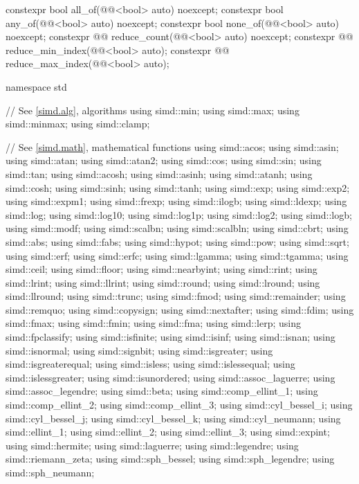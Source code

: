 \begin{codeblock}
{  constexpr bool all_of(@@<bool> auto) noexcept;
  constexpr bool any_of(@@<bool> auto) noexcept;
  constexpr bool none_of(@@<bool> auto) noexcept;
  constexpr @@ reduce_count(@@<bool> auto) noexcept;
  constexpr @@ reduce_min_index(@@<bool> auto);
  constexpr @@ reduce_max_index(@@<bool> auto);
}

namespace std {
  // See \ref{simd.alg}, algorithms
  using simd::min;
  using simd::max;
  using simd::minmax;
  using simd::clamp;

  // See \ref{simd.math}, mathematical functions
  using simd::acos;
  using simd::asin;
  using simd::atan;
  using simd::atan2;
  using simd::cos;
  using simd::sin;
  using simd::tan;
  using simd::acosh;
  using simd::asinh;
  using simd::atanh;
  using simd::cosh;
  using simd::sinh;
  using simd::tanh;
  using simd::exp;
  using simd::exp2;
  using simd::expm1;
  using simd::frexp;
  using simd::ilogb;
  using simd::ldexp;
  using simd::log;
  using simd::log10;
  using simd::log1p;
  using simd::log2;
  using simd::logb;
  using simd::modf;
  using simd::scalbn;
  using simd::scalbln;
  using simd::cbrt;
  using simd::abs;
  using simd::fabs;
  using simd::hypot;
  using simd::pow;
  using simd::sqrt;
  using simd::erf;
  using simd::erfc;
  using simd::lgamma;
  using simd::tgamma;
  using simd::ceil;
  using simd::floor;
  using simd::nearbyint;
  using simd::rint;
  using simd::lrint;
  using simd::llrint;
  using simd::round;
  using simd::lround;
  using simd::llround;
  using simd::trunc;
  using simd::fmod;
  using simd::remainder;
  using simd::remquo;
  using simd::copysign;
  using simd::nextafter;
  using simd::fdim;
  using simd::fmax;
  using simd::fmin;
  using simd::fma;
  using simd::lerp;
  using simd::fpclassify;
  using simd::isfinite;
  using simd::isinf;
  using simd::isnan;
  using simd::isnormal;
  using simd::signbit;
  using simd::isgreater;
  using simd::isgreaterequal;
  using simd::isless;
  using simd::islessequal;
  using simd::islessgreater;
  using simd::isunordered;
  using simd::assoc_laguerre;
  using simd::assoc_legendre;
  using simd::beta;
  using simd::comp_ellint_1;
  using simd::comp_ellint_2;
  using simd::comp_ellint_3;
  using simd::cyl_bessel_i;
  using simd::cyl_bessel_j;
  using simd::cyl_bessel_k;
  using simd::cyl_neumann;
  using simd::ellint_1;
  using simd::ellint_2;
  using simd::ellint_3;
  using simd::expint;
  using simd::hermite;
  using simd::laguerre;
  using simd::legendre;
  using simd::riemann_zeta;
  using simd::sph_bessel;
  using simd::sph_legendre;
  using simd::sph_neumann;

}
\end{codeblock}
